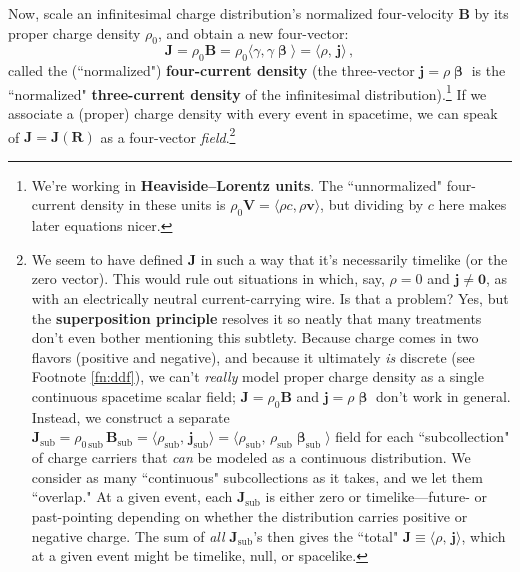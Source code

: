 \documentclass[12pt]{article}
\renewcommand{\vv}[1]{\mathbf{#1}}
\newcommand{\vvbeta}{\bm{\upbeta}}
\begin{document}
Now, scale an infinitesimal charge distribution's normalized four-velocity $\vv B$ by its proper charge density $\rho_0$, and obtain a new four-vector:
\begin{equation}\label{eq:fc}
\boxed{ \vv J = \rho_0 \vv B = \rho_0 \langle \gamma , \gamma \vvbeta \rangle = \langle \rho, \, \vv j \rangle } \, ,
\end{equation}
called the (``normalized") \textbf{four-current density} (the three-vector $\vv j = \rho \vvbeta$ is the ``normalized" \textbf{three-current density} of the infinitesimal distribution).\footnote{We're working in \textbf{Heaviside--Lorentz units}. The ``unnormalized" four-current density in these units is $\rho_0 \vv V = \langle \rho c, \rho \vv v \rangle$, but dividing by $c$ here makes later equations nicer.} If we associate a (proper) charge density with every event in spacetime, we can speak of $\vv J = \vv J (\vv R)$ as a four-vector \emph{field}.\footnote{\label{fn:jpart}We seem to have defined $\vv J$ in such a way that it's necessarily timelike (or the zero vector). This would rule out situations in which, say, $\rho = 0$ and $\vv j \neq \vv 0$, as with an electrically neutral current-carrying wire. Is that a problem? Yes, but the \textbf{superposition principle} resolves it so neatly that many treatments don't even bother mentioning this subtlety. Because charge comes in two flavors (positive and negative), and because it ultimately \emph{is} discrete (see Footnote \ref{fn:ddf}), we can't \emph{really} model proper charge density as a single continuous spacetime scalar field; $\vv J = \rho_0 \vv B$ and $\vv j = \rho \vvbeta$ don't work in general. Instead, we construct a separate ${\vv J_{\mathrm{sub}} = \rho_{0 \, \mathrm{sub}} \, \vv B_{\mathrm{sub}} = \langle \rho_{\mathrm{sub}}, \, \vv j_{\mathrm{sub}} \rangle} = \langle \rho_{\mathrm{sub}}, \, \rho_{\mathrm{sub}} \vvbeta_{\mathrm{sub}} \rangle$ field for each ``subcollection" of charge carriers that \emph{can} be modeled as a continuous distribution. We consider as many ``continuous" subcollections as it takes, and we let them ``overlap." At a given event, each $\vv J_{\mathrm{sub}}$ is either zero or timelike---future- or past-pointing depending on whether the distribution carries positive or negative charge. The sum of \emph{all} $\vv J_{\mathrm{sub}}$'s then gives the ``total" ${\vv J \equiv \langle \rho, \, \vv j \rangle }$, which at a given event might be timelike, null, or spacelike.}
\end{document}
